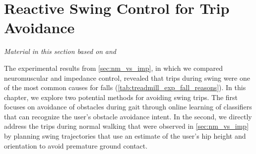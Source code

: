 \chapter{Reactive Swing Control for Trip Avoidance}\label{sec:trip_avoidance}
\graphicspath{{chapters/trip_avoidance/figures/}}

\emph{Material in this section based on}
\citet{gordon2019online}\cite{gordon2019online} \emph{and}
\citet{thatte2019realtime}\cite[0.25in]{thatte2019realtime} \linebreak

The experimental results from \cref{sec:nm_vs_imp}, in which we compared
neuromuscular and impedance control, revealed that trips during swing were one
of the most common causes for falls (\cref{tab:treadmill_exp_fall_reasons}). In
this chapter, we explore two potential methods for avoiding swing trips. The
first focuses on avoidance of obstacles during gait through online learning of
classifiers that can recognize the user's obstacle avoidance intent. In the
second, we directly address the trips during normal walking that were observed
in \cref{sec:nm_vs_imp} by planning swing trajectories that use an estimate of
the user's hip height and orientation to avoid premature ground contact.









